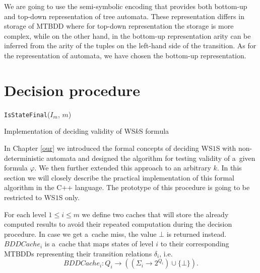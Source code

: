 We are going to use the semi-symbolic encoding that provides both bottom-up and
top-down representation of tree automata. These representation differs in
storage of MTBDD where for top-down representation the storage is more complex,
while on the other hand, in the bottom-up representation arity can be inferred
from the arity of the tuples on the left-hand side of the transition. As for the
representation of automata, we have chosen the bottom-up representation.

 \section{Decision procedure}
 \begin{algorithm}[h!]
		\BlankLine
		\nl\Return \texttt{IsStateFinal}($I_m$, $m$)\;
		\BlankLine
		\caption{Implementation of deciding validity of WS$k$S formula
		}\label{impl-main}
	\end{algorithm}
 
 In Chapter \ref{our} we introduced the formal concepts of deciding WS$1$S
 with non-deterministic automata and designed the algorithm for testing
 validity of a~given formula $\varphi$. We then further extended this approach
 to an arbitrary $k$. In this section we will closely describe the practical
 implementation of this formal algorithm in the C++ language. The prototype of
 this procedure is going to be restricted to WS$1$S only.
 
 For each level $1 \leq i \leq m$ we define two caches that will store the
 already computed results to avoid their repeated computation during the
 decision procedure. In case we get a~cache miss, the value $\bot$ is returned
 instead. $\mathit{BDDCache}_i$ is a~cache that maps states of level $i$ to
 their corresponding MTBDDs representing their transition relations $\delta_i$, i.e.
 \begin{equation}
  \mathit{BDDCache}_i : Q_i \rightarrow ((\Sigma_i \rightarrow 2^{Q_i}) \cup
  \{\bot\}).
 \end{equation}
 
